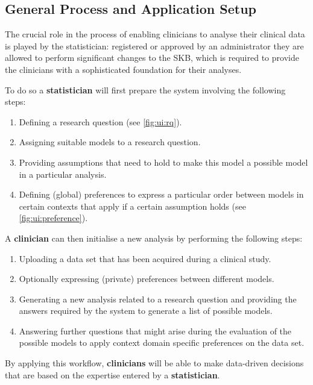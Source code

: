 \subsection{General Process and Application Setup}
\label{sub:process}
The crucial role in the process of enabling clinicians to analyse their clinical data is played by the statistician: registered or approved by an administrator they are allowed to perform significant changes to the \gls{SKB}, which is required to provide the clinicians with a sophisticated foundation for their analyses. 

\bigskip

To do so a \textbf{statistician} will first prepare the system involving the following steps:

\begin{enumerate}
	\item Defining a research question (see \autoref{fig:ui:rq}).
	\item Assigning suitable models to a research question.
	\item Providing assumptions that need to hold to make this model a possible model in a particular analysis.
	\item Defining (global) preferences to express a particular order between models in certain contexts that apply if a certain assumption holds (see \autoref{fig:ui:preference}).
\end{enumerate}

\bigskip

A \textbf{clinician} can then initialise a new analysis by performing the following steps:

\begin{enumerate}
	\item Uploading a data set that has been acquired during a clinical study.
	\item Optionally expressing (private) preferences between different models.
	\item Generating a new analysis related to a research question and providing the answers required by the system to generate a list of possible models.
	\item Answering further questions that might arise during the evaluation of the possible models to apply context domain specific preferences on the data set.
\end{enumerate}

By applying this workflow, \textbf{clinicians} will be able to make data-driven decisions that are based on the expertise entered by a \textbf{statistician}.

